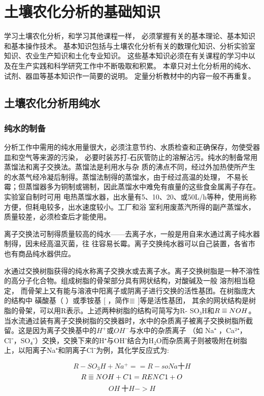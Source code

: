 \chapter{土壤农化分析的基础知识}
学习土壤农化分析，和学习其他课程一样， 必须掌握有关的基本理论、基本知识和基本操作技术。
基本知识包括与土壤农化分析有关的数理化知识、分析实验室知识、农业生产知识和土化专业知识。
这些基本知识必须在有关课程的学习中以及在生产实践和科学研究工作中不断吸取和积累。
本章只对土化分析用的纯水、试剂、器皿等基本知识作一简要的说明。
定量分析教材中的内容一般不再重复。

\section{土壤农化分析用纯水}
\subsection{纯水的制备}

分析工作中需用的纯水用量很大，必须注意节约、水质检查和正确保存，勿使受器皿和空气等来源的污染，
必要时装苏打-石灰管防止的溶解沾污。纯水的制备常用蒸馏法和离子交换法。蒸馏法是利用水与杂
质的沸点不同，经过外加热使所产生的水蒸气经冷凝后制得。蒸馏法制得的蒸馏水，由于经过高温的处理，
不易长霉；但蒸馏器多为铜制或锡制，因此蒸馏水中难免有痕量的这些食金属离子存在。实验室自制时可用
电热蒸馏水器，出水量有5、10、20、或50L/h等种，使用尚称方便，但耗电较多，出水速度较小。工厂和浴
室利用废蒸汽所得的副产蒸馏水，质量较差，必须检查后才能使用。

离子交换法可制得质量较高的纯水——去离子水，一般是用自来水通过离子纯水器制得，因未经高温灭菌，往
往容易长霉。离子交换纯水器可以自己装置，各省市也有商品纯水器供应。

水通过交换树脂获得的纯水称离子交换水或去离子水。离子交换树脂是一种不溶性的高分子化合物。组成树脂的骨架部分具有网状结构，对酸碱及一般
溶剂相当稳定， 而骨架上又有能与溶液中阳离子或阴离子进行交换的活性基团。在树脂庞大的结构中 磺酸基（ ）或季铵基
[  ，简作$\superequiv$ ]等是活性基团， 其余的网状结构是树脂的骨架，可以用R表示。上述两种树脂的结构可简写为R- SO₃H和$R\superequiv NOH$。
当水流通过装有离子交换树脂的交换器时，水中的杂质离子被离子交换树脂所截留。这是因为离子交换基中的$H^+$或$OH^-$与水中的杂质离子
（如 Na⁺ ，Ca²⁺，Cl⁻，SO₄⁻）交换，交换下来的H⁺与OH⁻结合为H₂O而杂质离子则被吸附在树脂上，以阳离子Na⁺和阴离子Cl⁻为例，其化学反应式为:

$$R- SO_{3}H + Na^+ == R- soNa十H$$
$$R \superequiv NOH+C1=RENC1+O$$
$$OH~十H->H$$

